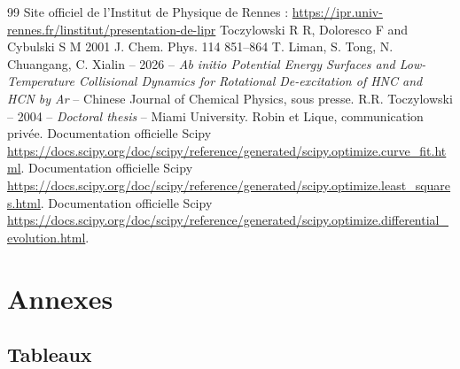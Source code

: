 \documentclass[11pt, a4paper, openany]{report}
\begin{document}

\begin{thebibliography}{99}
     Site officiel de l'Institut de Physique de Rennes : \url{https://ipr.univ-rennes.fr/linstitut/presentation-de-lipr}
     Toczylowski R R, Doloresco F and Cybulski S M 2001 J. Chem. Phys. 114 851–864
     T. Liman, S. Tong, N. Chuangang, C. Xialin -- 2026 -- \textit{Ab initio Potential Energy Surfaces and Low-Temperature
    Collisional Dynamics for Rotational De-excitation of HNC and HCN by Ar} -- Chinese Journal of Chemical Physics, sous presse.
     R.R. Toczylowski -- 2004 -- \textit{Doctoral thesis} -- Miami University.
     Robin et Lique, communication privée.
     Documentation officielle Scipy \url{https://docs.scipy.org/doc/scipy/reference/generated/scipy.optimize.curve_fit.html}.
     Documentation officielle Scipy \url{https://docs.scipy.org/doc/scipy/reference/generated/scipy.optimize.least_squares.html}.
     Documentation officielle Scipy \url{https://docs.scipy.org/doc/scipy/reference/generated/scipy.optimize.differential_evolution.html}.
\end{thebibliography}

\appendix
\chapter{Annexes}

\section{Tableaux}
\end{document}
